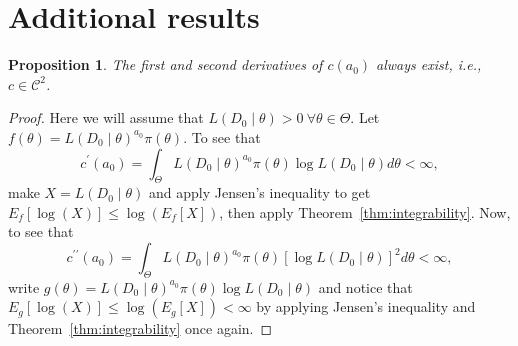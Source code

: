 \documentclass[a4paper, notitlepage, 11pt]{article}
\newtheorem{proposition}{Proposition}[]
\begin{document}


\appendix

\section{Additional results}
\label{sec:further_proofs}

\begin{proposition}
\label{prop:c_is_C2}
The first and second derivatives of $c(a_0)$ always exist, i.e., $c \in \mathcal{C}^2$. 
\end{proposition}
\begin{proof}
Here we will assume that $L(D_0 \mid \theta) > 0\: \forall \theta \in \Theta$.
Let $f(\theta) = L(D_0 \mid \theta)^{a_0}\pi(\theta)$.
To see that
\[c^\prime(a_0) = \int_{\Theta} L(D_0\mid\theta)^{a_0} \pi(\theta) \log L(D_0\mid\theta) d\theta < \infty, \]
make $ X = L( D_0 \mid \theta)$ and  apply Jensen's inequality to get $E_f[\log(X)] \leq \log\left(E_f[X]\right)$, then apply Theorem~\ref{thm:integrability}.
Now, to see that 
\[ c^{\prime\prime}(a_0) = \int_{\Theta} L(D_0\mid\theta)^{a_0} \pi(\theta) [\log L(D_0\mid\theta)]^2 d\theta < \infty, \]
write $g(\theta) =  L(D_0\mid\theta)^{a_0} \pi(\theta) \log L(D_0\mid\theta)$ and notice that $E_g[\log(X)] \leq \log(E_g[X]) < \infty$ by applying Jensen's inequality and Theorem~\ref{thm:integrability} once again.
\end{proof}
\end{document}
